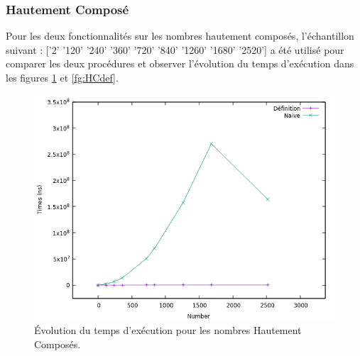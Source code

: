 	\subsubsection{Hautement Composé}
	Pour les deux fonctionnalités sur les nombres hautement composés, l'échantillon suivant : ['2' '120' '240' '360' '720' '840' '1260' '1680' '2520'] a été utilisé pour comparer les deux procédures et observer l'évolution du temps d'exécution dans les figures \ref{fg:HC} et \ref{fg:HCdef}.\\
	\begin{figure}[!ht]	
		\begin{center}\includegraphics[scale=0.6]{HC.png}\end{center}
		\caption{Évolution du temps d'exécution pour les nombres Hautement Composés.}
		\label{fg:HC}
	\end{figure}
	
